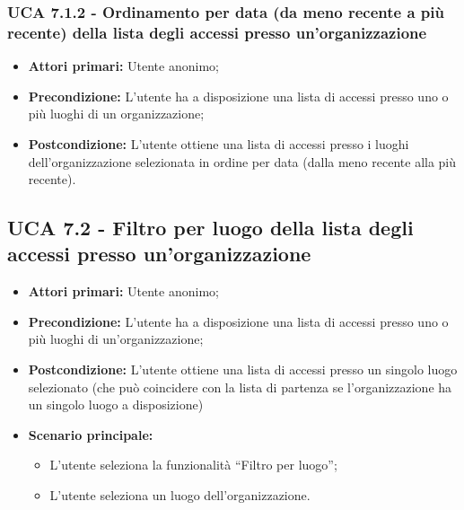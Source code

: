 \subsubsection{UCA 7.1.2 - Ordinamento per data (da meno recente a più recente) della lista degli accessi presso un’organizzazione}%
\begin{itemize}
	\item \textbf{Attori primari:} Utente anonimo;
	\item \textbf{Precondizione:} L’utente ha a disposizione una lista di accessi presso uno o più luoghi di un organizzazione;	
	\item \textbf{Postcondizione:} L’utente ottiene una lista di accessi presso i luoghi dell’organizzazione selezionata in ordine per data (dalla meno recente alla più recente).	
\end{itemize}

\subsection{UCA 7.2 - Filtro per luogo della lista degli accessi presso un’organizzazione}%
\begin{itemize}
	\item \textbf{Attori primari:} Utente anonimo;
	\item \textbf{Precondizione:} L’utente ha a disposizione una lista di accessi presso uno o più luoghi di un'organizzazione;
	\item \textbf{Postcondizione:} L’utente ottiene una lista di accessi presso un singolo luogo selezionato (che può coincidere con la lista di partenza se l’organizzazione ha un singolo luogo a disposizione)	
	\item \textbf{Scenario principale:}
	\begin{itemize}
		\item L’utente seleziona la funzionalità “Filtro per luogo”;
		\item L’utente seleziona un luogo dell’organizzazione.
	\end{itemize}
\end{itemize}